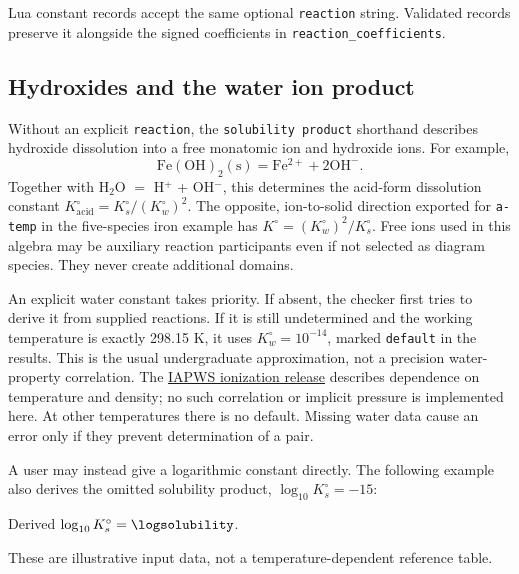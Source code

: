\documentclass[a4paper,11pt]{ltxdoc}
\begin{document}
Lua constant records accept the same optional \texttt{reaction} string.
Validated records preserve it alongside the signed coefficients in
\texttt{reaction\_coefficients}.

\subsection{Hydroxides and the water ion product}
Without an explicit \texttt{reaction}, the \texttt{solubility product} shorthand describes hydroxide dissolution
into a free monatomic ion and hydroxide ions. For example,
\[
 \mathrm{Fe(OH)_2(s)}=
 \mathrm{Fe^{2+}}+2\mathrm{OH^-}.
\]
Together with H$_2$O $=$ H$^+$ + OH$^-$, this determines the
acid-form dissolution constant $K^\circ_{\mathrm{acid}}=K_s^\circ/(K_w^\circ)^2$.
The opposite, ion-to-solid direction exported for \texttt{a-temp} in the
five-species iron example has $K^\circ=(K_w^\circ)^2/K_s^\circ$.
Free ions used in this algebra may be auxiliary reaction participants even if
not selected as diagram species. They never create additional domains.

An explicit water constant takes priority. If absent, the checker first tries
to derive it from supplied reactions. If it is still undetermined and the
working temperature is exactly 298.15 K, it uses $K_w^\circ=10^{-14}$, marked
\texttt{default} in the results. This is the usual undergraduate approximation,
not a precision water-property correlation. The
\href{https://www.iapws.org/relguide/Ionization.html}{IAPWS ionization release}
describes dependence on temperature and density; no such correlation or implicit
pressure is implemented here. At other temperatures there is no default.
Missing water data cause an error only if they prevent determination of a pair.

A user may instead give a logarithmic constant directly. The following example
also derives the omitted solubility product, $\log_{10}K_s^\circ=-15$:
\begin{codeexample}[width=0pt]
\hydroxidehandle
{}
Derived $\log_{10}K_s^\circ=\logsolubility$.
\end{codeexample}
These are illustrative input data, not a temperature-dependent reference table.
\end{document}
